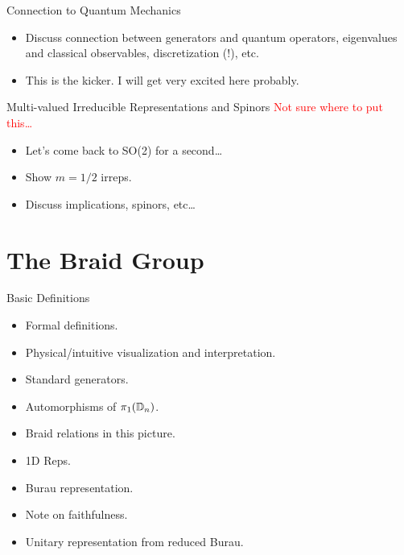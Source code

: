 \documentclass[compress,aspectratio=169,10pt,usenames,dvipsnames]{beamer}
\begin{document}

\begin{frame}{Connection to Quantum Mechanics}

\begin{itemize}
  \item Discuss connection between generators and quantum operators, eigenvalues and classical observables, discretization (!), etc.
  \item This is the kicker. I will get very excited here probably.
\end{itemize}

\end{frame}


\begin{frame}{Multi-valued Irreducible Representations and Spinors}
\textcolor{red}{Not sure where to put this\dots}
  
\begin{itemize}
  \item Let's come back to SO(2) for a second\dots
  \item Show $m=1/2$ irreps.
  \item Discuss implications, spinors, etc\dots
\end{itemize}

\end{frame}
  


\section{The Braid Group}
\begin{frame}
  \sectionpage
\end{frame}


\begin{frame}{Basic Definitions}

\vfill

\begin{itemize}
  \item Formal definitions.
  \item Physical/intuitive visualization and interpretation.
  \item Standard generators.
  \item Automorphisms of $\pi_1(\mathbb{D}_n)$.
  \item Braid relations in this picture.
  \item 1D Reps.
  \item Burau representation.
  \item Note on faithfulness.
  \item Unitary representation from reduced Burau.
\end{itemize}

\vfill

\end{frame}
\end{document}
